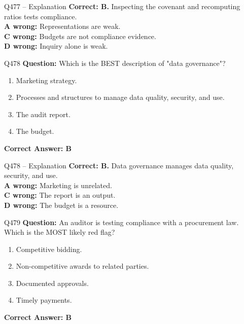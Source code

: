 \documentclass[aspectratio=169,10pt]{beamer}
\begin{document}
	\begin{frame}[t]{Q477 -- Explanation}
		\small
		\textbf{Correct: B.} Inspecting the covenant and recomputing ratios tests compliance. \\[4pt]
		\textbf{A wrong:} Representations are weak. \\[2pt]
		\textbf{C wrong:} Budgets are not compliance evidence. \\[2pt]
		\textbf{D wrong:} Inquiry alone is weak.
	\end{frame}
	
	\begin{frame}[t]{Q478}
		\small
		\textbf{Question:} Which is the BEST description of "data governance"?
		\begin{enumerate}[label=\Alph*.,itemsep=1pt,topsep=2pt]
			\item Marketing strategy.
			\item Processes and structures to manage data quality, security, and use.
			\item The audit report.
			\item The budget.
		\end{enumerate}
		\vspace{4pt}
		\textbf{Correct Answer: B}
	\end{frame}
	
	\begin{frame}[t]{Q478 -- Explanation}
		\small
		\textbf{Correct: B.} Data governance manages data quality, security, and use. \\[4pt]
		\textbf{A wrong:} Marketing is unrelated. \\[2pt]
		\textbf{C wrong:} The report is an output. \\[2pt]
		\textbf{D wrong:} The budget is a resource.
	\end{frame}
	
	\begin{frame}[t]{Q479}
		\small
		\textbf{Question:} An auditor is testing compliance with a procurement law. Which is the MOST likely red flag?
		\begin{enumerate}[label=\Alph*.,itemsep=1pt,topsep=2pt]
			\item Competitive bidding.
			\item Non-competitive awards to related parties.
			\item Documented approvals.
			\item Timely payments.
		\end{enumerate}
		\vspace{4pt}
		\textbf{Correct Answer: B}
	\end{frame}
	
\end{document}
